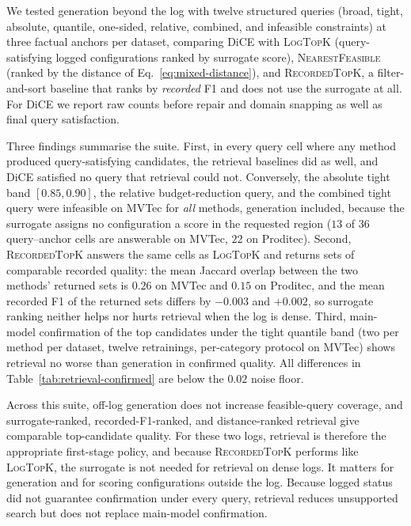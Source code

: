 \documentclass[final,5p,times,twocolumn]{elsarticle}
\begin{document}
We tested generation beyond the log with twelve structured queries
(broad, tight, absolute, quantile, one-sided, relative, combined, and
infeasible constraints) at three factual anchors per dataset, comparing
DiCE with \textsc{LogTopK} (query-satisfying logged configurations
ranked by surrogate score), \textsc{NearestFeasible} (ranked by the
distance of Eq.~\ref{eq:mixed-distance}), and \textsc{RecordedTopK}, a
filter-and-sort baseline that ranks by \emph{recorded} F1 and does not
use the surrogate at all. For DiCE we report raw counts before repair
and domain snapping as well as final query satisfaction.

Three findings summarise the suite. First, in every query cell where
any method produced query-satisfying candidates, the retrieval
baselines did as well, and DiCE satisfied no query that retrieval could not. Conversely, the absolute tight band $[0.85, 0.90]$, the relative
budget-reduction query, and the combined tight query were infeasible on
MVTec for \emph{all} methods, generation included, because the surrogate
assigns no configuration a score in the requested region ($13$ of $36$
query--anchor cells are answerable on MVTec, $22$ on Proditec). Second,
\textsc{RecordedTopK} answers the same cells as \textsc{LogTopK} and
returns sets of comparable recorded quality: the mean Jaccard overlap
between the two methods' returned sets is $0.26$ on MVTec and $0.15$ on
Proditec, and the mean recorded F1 of the returned sets differs by
$-0.003$ and $+0.002$, so surrogate ranking neither helps nor hurts
retrieval when the log is dense. Third, main-model confirmation of the
top candidates under the tight quantile band (two per method per
dataset, twelve retrainings, per-category protocol on MVTec) shows retrieval no worse than generation in confirmed quality. All differences in Table~\ref{tab:retrieval-confirmed} are below the $0.02$ noise floor.

Across this suite, off-log generation does not increase feasible-query
coverage, and surrogate-ranked, recorded-F1-ranked, and distance-ranked
retrieval give comparable top-candidate quality. For these two logs, retrieval is therefore the appropriate first-stage policy, and because \textsc{RecordedTopK} performs like \textsc{LogTopK}, the surrogate is not needed for retrieval on dense logs. It matters for generation and for scoring configurations outside the log. Because logged status did not guarantee confirmation under every query, retrieval reduces unsupported search but does not replace main-model confirmation.
\end{document}
